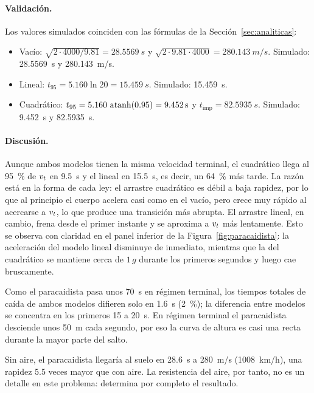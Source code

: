 \paragraph{Validación.} Los valores simulados coinciden con las fórmulas de la Sección~\ref{sec:analiticas}:
\begin{itemize}
  \item Vacío: $\sqrt{2\cdot 4000/9.81} = \qty{28.5569}{s}$ y $\sqrt{2\cdot 9.81\cdot 4000} = \qty{280.143}{m/s}$. Simulado: \qty{28.5569}{s} y \qty{280.143}{m/s}.
  \item Lineal: $t_{95} = 5.160\ln 20 = \qty{15.459}{s}$. Simulado: \qty{15.459}{s}.
  \item Cuadrático: $t_{95} = 5.160\,\operatorname{atanh}(0.95) = \qty{9.452}{s}$ y $t_{\text{imp}} = \qty{82.5935}{s}$. Simulado: \qty{9.452}{s} y \qty{82.5935}{s}.
\end{itemize}

\paragraph{Discusión.}
Aunque ambos modelos tienen la misma velocidad terminal, el cuadrático llega al \qty{95}{\percent} de $v_t$ en \qty{9.5}{s} y el lineal en \qty{15.5}{s}, es decir, un \qty{64}{\percent} más tarde. La razón está en la forma de cada ley: el arrastre cuadrático es débil a baja rapidez, por lo que al principio el cuerpo acelera casi como en el vacío, pero crece muy rápido al acercarse a $v_t$, lo que produce una transición más abrupta. El arrastre lineal, en cambio, frena desde el primer instante y se aproxima a $v_t$ más lentamente. Esto se observa con claridad en el panel inferior de la Figura~\ref{fig:paracaidista}: la aceleración del modelo lineal disminuye de inmediato, mientras que la del cuadrático se mantiene cerca de $1\,g$ durante los primeros segundos y luego cae bruscamente.

Como el paracaidista pasa unos \qty{70}{s} en régimen terminal, los tiempos totales de caída de ambos modelos difieren solo en \qty{1.6}{s} (\qty{2}{\percent}); la diferencia entre modelos se concentra en los primeros 15 a \qty{20}{s}. En régimen terminal el paracaidista desciende unos \qty{50}{m} cada segundo, por eso la curva de altura es casi una recta durante la mayor parte del salto.

Sin aire, el paracaidista llegaría al suelo en \qty{28.6}{s} a \qty{280}{m/s} (\qty{1008}{km/h}), una rapidez 5.5 veces mayor que con aire. La resistencia del aire, por tanto, no es un detalle en este problema: determina por completo el resultado.

